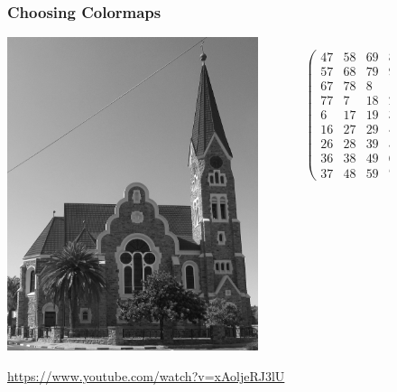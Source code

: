 \documentclass{beamer}
\begin{document}
\begin{frame}
\begin{figure}
    \frametitle{Choosing Colormaps}
    \begin{columns}
	\begin{column}{0.5\textwidth}
		\begin{center}
		\includegraphics[width=0.9\textwidth]{../testimage.jpg}
		\end{center}
	\end{column}
	\begin{column}{0.5\textwidth}
		\tiny{
		\begin{equation*}
		\begin{pmatrix}
		47 & 58 & 69 & 80 & 1 & 12 & 23 & 34 & 45 \\
    	57 & 68 & 79 & 9 & 11 & 22 & 33 & 44 & 46 \\
    	67 & 78 & 8 & 10 & 21 & 32 & 43 & 54 & 56 \\
    	77 & 7 & 18 & 20 & 31 & 42 & 53 & 55 & 66 \\
    	6 & 17 & 19 & 30 & 41 & 52 & 63 & 65 & 76 \\
    	16 & 27 & 29 & 40 & 51 & 62 & 64 & 75 & 5 \\
    	26 & 28 & 39 & 50 & 61 & 72 & 74 & 4 & 15 \\
    	36 & 38 & 49 & 60 & 71 & 73 & 3 & 14 & 25 \\
    	37 & 48 & 59 & 70 & 81 & 2 & 13 & 24 & 35
		\end{pmatrix}
		\end{equation*}
		}
	\end{column}
	\end{columns}
	\begin{center}
	\url{https://www.youtube.com/watch?v=xAoljeRJ3lU}
	\end{center}
\end{figure}
\end{frame}
\end{document}
